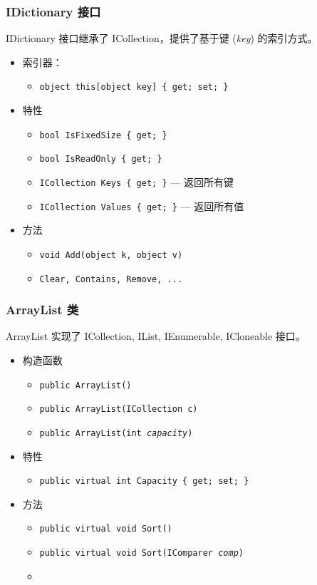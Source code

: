 \begin{frame}
\frametitle{IDictionary 接口}
\CJKindent IDictionary 接口继承了 ICollection，提供了基于键 (\textit{key}) 的索引方式。
\begin{itemize}
\item 索引器：
  \begin{itemize}
  \item \texttt{object this[object key] \{ get; set; \}}
  \end{itemize}
\item 特性
\begin{itemize}
\item \texttt{bool IsFixedSize \{ get; \}}
\item \texttt{bool IsReadOnly \{ get; \}}
\item \texttt{ICollection Keys \{ get; \}} --- 返回所有键
\item \texttt{ICollection Values \{ get; \}} --- 返回所有值
\end{itemize}
\item 方法
\begin{itemize}
\item \texttt{void Add(object k, object v)}
\item \texttt{Clear, Contains, Remove, ...}
\end{itemize}
\end{itemize}
\end{frame}

\begin{frame}
\frametitle{ArrayList 类}
ArrayList 实现了 ICollection, IList, IEnumerable, ICloneable 接口。
\begin{itemize}
\item 构造函数
\begin{itemize}
\item \texttt{public ArrayList()}
\item \texttt{public ArrayList(ICollection c)}
\item \texttt{public ArrayList(int \textit{capacity})}
\end{itemize}
\item 特性
  \begin{itemize}
  \item \texttt{public virtual int Capacity \{ get; set; \}}
  \end{itemize}
\item 方法
  \begin{itemize}
  \item \texttt{public virtual void Sort()}
  \item \texttt{public virtual void Sort(IComparer \textit{comp})}
  \item \href{http://msdn2.microsoft.com/en-us/library/system.collections.arraylist_members.aspx}{}
  \end{itemize}
\end{itemize}
\end{frame}

